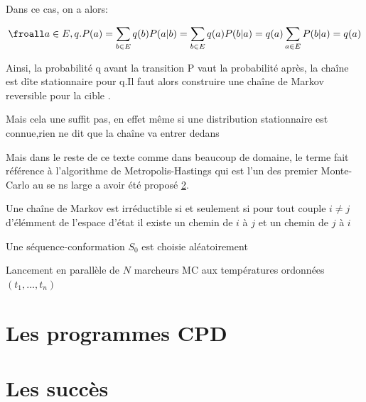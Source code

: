 Dans ce cas, on a alors:

\begin{equation}
\froall a \in E, q.P (a) = \sum_{b \in E} q(b)P(a|b) = \sum_{b \in E} q(a)P(b|a) = q(a) \sum_{a \in E}P(b|a) = q(a)
\end{equation}

Ainsi, la probabilité q avant la transition P vaut la probabilité après, la chaîne est dîte stationnaire pour q.Il faut alors construire une chaîne de Markov reversible pour la cible \pi.

Mais cela une suffit pas, en effet même si une distribution stationnaire est connue,rien ne dit que la chaîne va entrer dedans 




Mais dans le reste de ce texte  comme dans beaucoup de domaine, le terme fait référence à l'algorithme de Metropolis-Hastings qui est l'un des premier Monte-Carlo au se
ns large a avoir été proposé \ref{}.




Une chaîne de Markov est irréductible si et seulement si pour tout couple   $i \neq j$   d'élémment de l'espace d'état il existe un chemin de   $i$  à   $j$   et un chemin de   $j$ à $i$ 





\begin{algorithm}
  Une séquence-conformation $S_0$ est choisie aléatoirement\;
  
\end{algorithm}

\begin{algorithm}
  Lancement en parallèle de $N$ marcheurs MC aux températures ordonnées $(t_1,...,t_n)$ \;
\end{algorithm}





\section{Les programmes CPD}
\section{Les succès}

